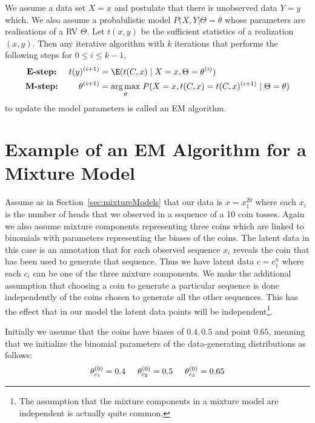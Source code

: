 \begin{Definition}[EM algorithm]\label{def:EM}
We assume a data set $ X = x $ and postulate that there is unobserved data $ Y = y $ which. We also
assume a probabilistic model $ P(X,Y|\Theta = \theta $ whose parameters are realisations of a RV
$ \Theta $. Let $ t(x,y) $ be the sufficient statistics of a realization $ (x,y) $. Then any
iterative algorithm with $ k $ iterations that performs the following
steps for $0\leq i \leq k-1$, 
\begin{align*}
\mbox{\textbf{E-step:} } \quad t(y)^{(i+1)} &= \E(t(C,x) \mid X = x, \Theta = \theta^{(i)}) \\
\mbox{\textbf{M-step:} } \qquad \theta^{(i+1)} &= \underset{\theta}{\arg\max} \; P(X=x, t(C,x) = t(C,x)^{(i+1)} \mid \Theta = \theta) 
\end{align*}
to update the model parameters is called an EM algorithm. 
\end{Definition}

\section{Example of an EM Algorithm for a Mixture Model}

Assume as in Section~\ref{sec:mixtureModels} that our data is $ x=x^{20}_{1} $ where each $ x_{i} $ is the 
number of heads that we observed in a sequence of a 10 coin tosses. Again we also assume mixture components representing three coins which are linked
to binomials with parameters representing the biases of the coins. 
The latent data in this case is an annotation that for each observed sequence $ x_{i} $ reveals the coin that has been used
to generate that sequence. Thus we have latent data $ c=c_{1}^{n} $ where each $ c_{i} $ can be one of the three mixture components. 
We make the additional assumption that choosing a coin to generate a particular sequence is done independently of the coins chosen
to generate all the other sequences. This has the effect that in our model the latent data points will be independent\footnote{The assumption
that the mixture components in a mixture model are independent is actually quite common.}.

Initially we assume that the coins have biases of $ 0.4, 0.5 $ and point $ 0.65 $, meaning that we initialize the binomial parameters of the data-generating
distributions as follows:
\begin{equation}
\theta^{(0)}_{c_{1}} = 0.4 \hskip 0.5cm  \theta^{(0)}_{c_{2}} = 0.5 \hskip 0.5cm  \theta^{(0)}_{c_{3}} = 0.65
\end{equation}

